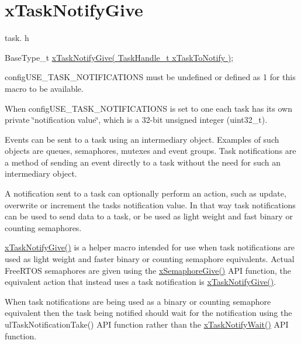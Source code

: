 \hypertarget{group__x_task_notify_give}{}\section{x\+Task\+Notify\+Give}
\label{group__x_task_notify_give}
task. h 
\begin{DoxyPre}BaseType\_t \hyperlink{vendor_2ceedling_2plugins_2freertos_2src_2freertos_2include_2task_8h_ac60cbd05577a3e4f3c3587dd9b213930}{xTaskNotifyGive( TaskHandle\_t xTaskToNotify )};\end{DoxyPre}


config\+U\+S\+E\+\_\+\+T\+A\+S\+K\+\_\+\+N\+O\+T\+I\+F\+I\+C\+A\+T\+I\+O\+NS must be undefined or defined as 1 for this macro to be available.

When config\+U\+S\+E\+\_\+\+T\+A\+S\+K\+\_\+\+N\+O\+T\+I\+F\+I\+C\+A\+T\+I\+O\+NS is set to one each task has its own private \char`\"{}notification value\char`\"{}, which is a 32-\/bit unsigned integer (uint32\+\_\+t).

Events can be sent to a task using an intermediary object. Examples of such objects are queues, semaphores, mutexes and event groups. Task notifications are a method of sending an event directly to a task without the need for such an intermediary object.

A notification sent to a task can optionally perform an action, such as update, overwrite or increment the task\textquotesingle{}s notification value. In that way task notifications can be used to send data to a task, or be used as light weight and fast binary or counting semaphores.

\hyperlink{vendor_2ceedling_2plugins_2freertos_2src_2freertos_2include_2task_8h_ac60cbd05577a3e4f3c3587dd9b213930}{x\+Task\+Notify\+Give()} is a helper macro intended for use when task notifications are used as light weight and faster binary or counting semaphore equivalents. Actual Free\+R\+T\+OS semaphores are given using the \hyperlink{externals_2freertos_2include_2semphr_8h_aae55761cabfa9bf85c8f4430f78c0953}{x\+Semaphore\+Give()} A\+PI function, the equivalent action that instead uses a task notification is \hyperlink{vendor_2ceedling_2plugins_2freertos_2src_2freertos_2include_2task_8h_ac60cbd05577a3e4f3c3587dd9b213930}{x\+Task\+Notify\+Give()}.

When task notifications are being used as a binary or counting semaphore equivalent then the task being notified should wait for the notification using the ul\+Task\+Notification\+Take() A\+PI function rather than the \hyperlink{vendor_2ceedling_2plugins_2freertos_2src_2freertos_2include_2task_8h_a0475fcda9718f403521c270a7270ff93}{x\+Task\+Notify\+Wait()} A\+PI function.


